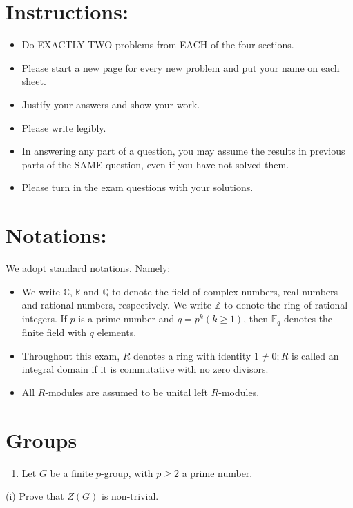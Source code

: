 \documentclass[10pt]{article}
\begin{document}
\section*{Instructions: }
\begin{itemize}
  \item Do EXACTLY TWO problems from EACH of the four sections.

  \item Please start a new page for every new problem and put your name on each sheet.

  \item Justify your answers and show your work.

  \item Please write legibly.

  \item In answering any part of a question, you may assume the results in previous parts of the SAME question, even if you have not solved them.

  \item Please turn in the exam questions with your solutions.

\end{itemize}
\section{Notations:}
We adopt standard notations. Namely:

\begin{itemize}
  \item We write $\mathbb{C}, \mathbb{R}$ and $\mathbb{Q}$ to denote the field of complex numbers, real numbers and rational numbers, respectively. We write $\mathbb{Z}$ to denote the ring of rational integers. If $p$ is a prime number and $q=p^{k}(k \geq 1)$, then $\mathbb{F}_{q}$ denotes the finite field with $q$ elements.

  \item Throughout this exam, $R$ denotes a ring with identity $1 \neq 0 ; R$ is called an integral domain if it is commutative with no zero divisors.

  \item All $R$-modules are assumed to be unital left $R$-modules.

\end{itemize}
\section{Groups}
\begin{enumerate}
  \item Let $G$ be a finite $p$-group, with $p \geq 2$ a prime number.
\end{enumerate}
(i) Prove that $Z(G)$ is non-trivial.
\end{document}
